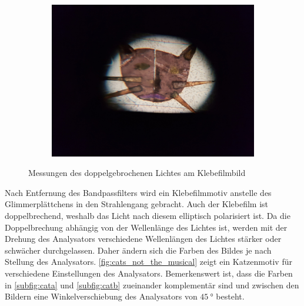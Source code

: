 \begin{figure}[tb]
\begin{subfigure}{.3\textwidth}
		\label{subfig:catb}
	\end{subfigure}
	$\quad$
	\begin{subfigure}{.3\textwidth}
		\centering
		\includegraphics[height=.8\linewidth]{./img/cat3.jpg}
		\label{subfig:catc}
	\end{subfigure}
	\caption[Doppelbrechung von polychromatischem Licht]{Messungen des doppelgebrochenen Lichtes am Klebefilmbild}
	\label{fig:cats_not_the_musical}
\end{figure}
Nach Entfernung des Bandpassfilters wird ein Klebefilmmotiv anstelle des Glimmerplättchens in den Strahlengang gebracht.
Auch der Klebefilm ist doppelbrechend, weshalb das Licht nach diesem elliptisch polarisiert ist.
Da die Doppelbrechung abhängig von der Wellenlänge des Lichtes ist, werden mit der Drehung des Analysators verschiedene Wellenlängen des Lichtes stärker oder schwächer durchgelassen.
Daher ändern sich die Farben des Bildes je nach Stellung des Analysators.
\autoref{fig:cats_not_the_musical} zeigt ein Katzenmotiv für verschiedene Einstellungen des Analysators.
Bemerkenswert ist, dass die Farben in \autoref{subfig:cata} und \autoref{subfig:catb} zueinander komplementär sind und zwischen den Bildern eine Winkelverschiebung des Analysators von $\SI{45}{\degree}$ besteht.
